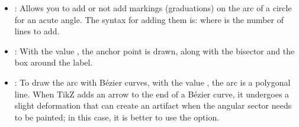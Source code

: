 \begin{itemize}
    \item {}: Allows you to add or not add markings (graduations) on the arc of a circle for an acute angle. The syntax for adding them is:  where  is the number of lines to add.

    \item {}: With the value \true, the anchor point is drawn, along with the bisector and the box around the label.

    \item {}: To draw the arc with Bézier curves, with the value \false, the arc is a polygonal line. When TikZ adds an arrow to the end of a Bézier curve, it undergoes a slight deformation that can create an artifact when the angular sector needs to be painted; in this case, it is better to use the  option.
\end{itemize}

